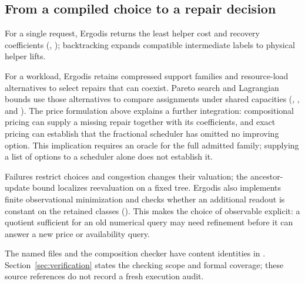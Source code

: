 \subsection{From a compiled choice to a repair decision}

For a single request, Ergodis returns the least helper cost and recovery
coefficients (, ); backtracking
expands compatible intermediate labels to physical helper lifts.

For a workload, Ergodis retains compressed support families and
resource-load alternatives to select repairs that can coexist.  Pareto search and
Lagrangian bounds use those alternatives to compare assignments under shared
capacities (, , and
).  The price formulation above explains a further integration:
compositional pricing can supply a missing repair together with its
coefficients, and exact pricing can establish that the fractional scheduler
has omitted no improving option.  This implication requires an oracle for
the full admitted family; supplying a list of options to a scheduler alone
does not establish it.

Failures restrict choices and congestion changes their valuation; the
ancestor-update bound localizes reevaluation on a fixed tree.  Ergodis also implements finite
observational minimization and checks whether an additional readout is
constant on the retained classes ().
This makes the choice of observable
explicit: a quotient sufficient for an old numerical query may need refinement
before it can answer a new price or availability query.

The named files and the composition checker
 have content identities in
.
Section~\ref{sec:verification} states the checking scope and formal coverage; these source references do not record a fresh execution audit.
